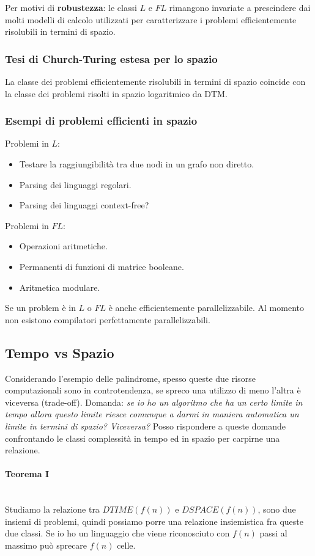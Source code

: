 \documentclass{article}
\begin{document}
Per motivi di \textbf{robustezza}: le classi $L$ e $FL$ rimangono invariate a prescindere dai molti modelli
di calcolo utilizzati per caratterizzare i problemi efficientemente risolubili in termini di spazio.

\subsubsection{Tesi di Church-Turing estesa per lo spazio}
La classe dei problemi efficientemente risolubili in termini di spazio coincide con la classe dei problemi
risolti in spazio logaritmico da DTM.

\subsubsection{Esempi di problemi efficienti in spazio}
Problemi in $L$:
\begin{itemize}
    \item Testare la raggiungibilità tra due nodi in un grafo non diretto.
    \item Parsing dei linguaggi regolari.
    \item Parsing dei linguaggi context-free?
\end{itemize}
Problemi in $FL$:
\begin{itemize}
    \item Operazioni aritmetiche.
    \item Permanenti di funzioni di matrice booleane.
    \item Aritmetica modulare.
\end{itemize}

Se un problem è in $L$ o $FL$ è anche efficientemente parallelizzabile. Al momento non esistono compilatori
perfettamente parallelizzabili.

\subsection{Tempo vs Spazio}
Considerando l'esempio delle palindrome, spesso queste due risorse computazionali sono in controtendenza,
se spreco una utilizzo di meno l'altra è viceversa (trade-off). Domanda: \textit{se io ho
un algoritmo che ha un certo limite in tempo allora questo limite riesce comunque a darmi
in maniera automatica un limite in termini di spazio? Viceversa?}
Posso rispondere a queste domande confrontando le classi complessità in tempo ed in spazio per
carpirne una relazione.

\paragraph{Teorema I}\mbox{}\\
Studiamo la relazione tra $DTIME(f(n))$ e $DSPACE(f(n))$, sono due insiemi di problemi, quindi
possiamo porre una relazione insiemistica fra queste due classi. Se io ho un linguaggio
che viene riconosciuto con $f(n)$ passi al massimo può sprecare $f(n)$ celle.
\end{document}
